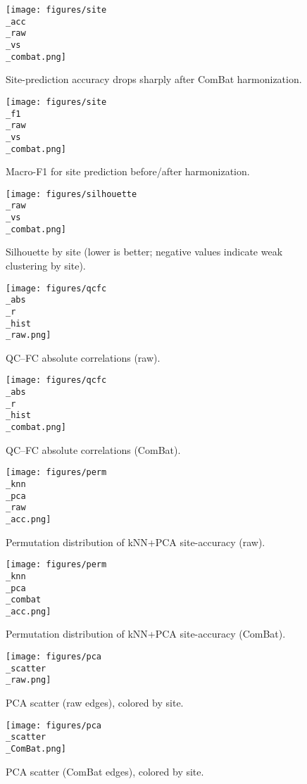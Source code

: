 \begin{figure}[t]
\centering
\texttt{[image: figures/site\\\_acc\\\_raw\\\_vs\\\_combat.png]}
\caption{Site-prediction accuracy drops sharply after ComBat harmonization.}
\label{fig:site_acc_raw_vs_combat}
\end{figure}

\begin{figure}[t]
\centering
\texttt{[image: figures/site\\\_f1\\\_raw\\\_vs\\\_combat.png]}
\caption{Macro-F1 for site prediction before/after harmonization.}
\label{fig:site_f1_raw_vs_combat}
\end{figure}

\begin{figure}[t]
\centering
\texttt{[image: figures/silhouette\\\_raw\\\_vs\\\_combat.png]}
\caption{Silhouette by site (lower is better; negative values indicate weak clustering by site).}
\label{fig:silhouette_raw_vs_combat}
\end{figure}

\begin{figure}[t]
\centering
\texttt{[image: figures/qcfc\\\_abs\\\_r\\\_hist\\\_raw.png]}
\caption{QC–FC absolute correlations (raw).}
\label{fig:qcfc_abs_r_hist_raw}
\end{figure}

\begin{figure}[t]
\centering
\texttt{[image: figures/qcfc\\\_abs\\\_r\\\_hist\\\_combat.png]}
\caption{QC–FC absolute correlations (ComBat).}
\label{fig:qcfc_abs_r_hist_combat}
\end{figure}

\begin{figure}[t]
\centering
\texttt{[image: figures/perm\\\_knn\\\_pca\\\_raw\\\_acc.png]}
\caption{Permutation distribution of kNN+PCA site-accuracy (raw).}
\label{fig:perm_knn_pca_raw_acc}
\end{figure}

\begin{figure}[t]
\centering
\texttt{[image: figures/perm\\\_knn\\\_pca\\\_combat\\\_acc.png]}
\caption{Permutation distribution of kNN+PCA site-accuracy (ComBat).}
\label{fig:perm_knn_pca_combat_acc}
\end{figure}

\begin{figure}[t]
\centering
\texttt{[image: figures/pca\\\_scatter\\\_raw.png]}
\caption{PCA scatter (raw edges), colored by site.}
\label{fig:pca_scatter_raw}
\end{figure}

\begin{figure}[t]
\centering
\texttt{[image: figures/pca\\\_scatter\\\_ComBat.png]}
\caption{PCA scatter (ComBat edges), colored by site.}
\label{fig:pca_scatter_ComBat}
\end{figure}
